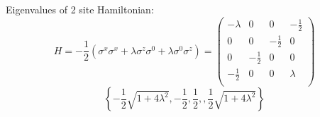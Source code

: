\documentclass[12pt,a4paper]{report}
\begin{document}
Eigenvalues of 2 site Hamiltonian:
\begin{equation}
	H=-\frac{1}{2} \left(\sigma^{x} \sigma^{x}+\lambda\sigma^{z} \sigma^0+\lambda\sigma^0\sigma^{z}\right) =
	\left(
	\begin{array}{cccc}
		-\lambda  & 0 & 0 & -\frac{1}{2} \\
		0 & 0 & -\frac{1}{2} & 0 \\
		0 & -\frac{1}{2} & 0 & 0 \\
		-\frac{1}{2} & 0 & 0 & \lambda  \\
	\end{array}
	\right)
\end{equation}
\begin{equation}
	\left\{-\frac{1}{2} \sqrt{1+4 \lambda ^2},-\frac{1}{2},\frac{1}{2},,\frac{1}{2} \sqrt{1+4 \lambda ^2}\right\}
\end{equation}
\end{document}
